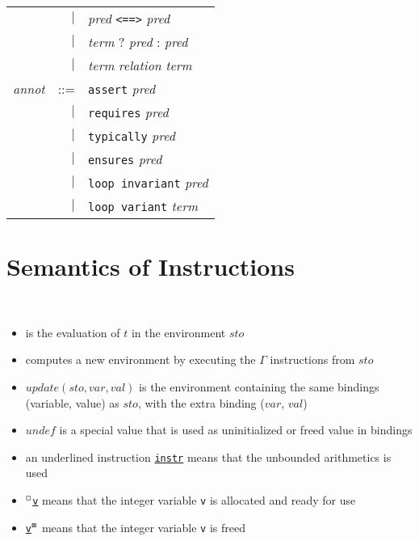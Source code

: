 \begin{tabular}{lrl}
  & $\mid$ & \textit{pred} \lstinline'<==>' \textit{pred} \\
  & $\mid$ & \textit{term} ? \textit{pred} : \textit{pred} \\
  & $\mid$ & \textit{term} \textit{relation} \textit{term} \\
  \textit{annot} & ::= & \lstinline'assert' \textit{pred} \\
  & $\mid$ & \lstinline'requires' \textit{pred} \\
  & $\mid$ & \lstinline'typically' \textit{pred} \\
  & $\mid$ & \lstinline'ensures' \textit{pred} \\
  & $\mid$ & \lstinline'loop invariant' \textit{pred} \\
  & $\mid$ & \lstinline'loop variant' \textit{term}
\end{tabular}


\section{Semantics of Instructions}
\label{sec:semantics}


\begin{notation}
  ~
  \begin{itemize}
  \item {} is the evaluation of $t$ in the environment $sto$
  \item {} computes a new environment by executing the
    $\Gamma$ instructions from $sto$
  \item $update(sto, var, val)$ is the environment containing the same
    bindings (variable, value) as $sto$, with the extra binding ($var$, $val$)
  \item $undef$ is a special value that is used as uninitialized or freed value
    in bindings
  \item an underlined instruction \underline{\lstinline{instr}} means that the
    unbounded arithmetics is used
  \item ${^\square}$\underline{\lstinline{v}} means that the integer variable
    \lstinline'v' is allocated and ready for use
  \item \underline{\lstinline{v}}${^\boxtimes}$ means that the integer variable
    \lstinline'v' is freed
  \end{itemize}
\end{notation}


